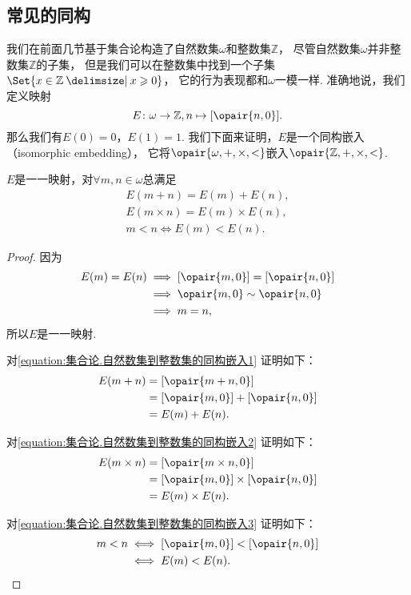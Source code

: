 \subsection{常见的同构}
我们在前面几节基于集合论构造了自然数集\(\omega\)和整数集\(\mathbb{Z}\)，
尽管自然数集\(\omega\)并非整数集\(\mathbb{Z}\)的子集，
但是我们可以在整数集中找到一个子集\(\Set{ x \in \mathbb{Z} \given x \geqslant 0 }\)，
它的行为表现都和\(\omega\)一模一样.
准确地说，我们定义映射\[
	E\colon \omega\to\mathbb{Z}, n\mapsto[\opair{n,0}].
\]
那么我们有\(E(0)=0\)，\(E(1)=1\).
我们下面来证明，\(E\)是一个同构嵌入（isomorphic embedding），%
它将\(\opair{\omega,+,\times,<}\)嵌入\(\opair{\mathbb{Z},+,\times,<}\).
\begin{theorem}
\(E\)是一一映射，对\(\forall m,n\in\omega\)总满足
\begin{gather}
	E(m+n)=E(m)+E(n),
	\label{equation:集合论.自然数集到整数集的同构嵌入1} \\
	E(m \times n)=E(m) \times E(n),
	\label{equation:集合论.自然数集到整数集的同构嵌入2} \\
	m<n \iff E(m)<E(n).
	\label{equation:集合论.自然数集到整数集的同构嵌入3}
\end{gather}
\begin{proof}
因为\begin{align*}
	E(m)=E(n)
	&\implies
	[\opair{m,0}]=[\opair{n,0}] \\
	&\implies
	\opair{m,0}\sim\opair{n,0} \\
	&\implies
	m=n,
\end{align*}
所以\(E\)是一一映射.

对\cref{equation:集合论.自然数集到整数集的同构嵌入1} 证明如下：
\begin{align*}
	E(m+n)
	&= [\opair{m+n,0}] \\
	&= [\opair{m,0}]+[\opair{n,0}] \\
	&= E(m)+E(n).
\end{align*}

对\cref{equation:集合论.自然数集到整数集的同构嵌入2} 证明如下：
\begin{align*}
	E(m \times n)
	&= [\opair{m \times n,0}] \\
	&= [\opair{m,0}]\times[\opair{n,0}] \\
	&= E(m) \times E(n).
\end{align*}

对\cref{equation:集合论.自然数集到整数集的同构嵌入3} 证明如下：
\begin{align*}
	m<n
	&\iff
	[\opair{m,0}]<[\opair{n,0}] \\
	&\iff
	E(m)<E(n).
	\qedhere
\end{align*}
\end{proof}
\end{theorem}

